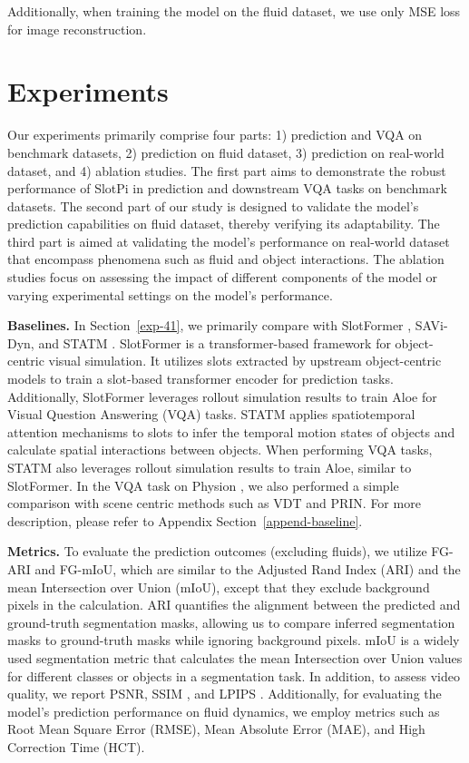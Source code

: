 \documentclass[sigconf]{acmart}
\begin{document}
Additionally, when training the model on the fluid dataset, we use only MSE loss for image reconstruction.


\section{Experiments}

Our experiments primarily comprise four parts: 1) prediction and VQA on benchmark datasets, 2) prediction on fluid dataset, 3)  prediction on real-world dataset, and 4) ablation studies. The first part aims to demonstrate the robust performance of SlotPi in prediction and downstream VQA tasks on benchmark datasets. The second part of our study is designed to validate the model's prediction capabilities on fluid dataset, thereby verifying its adaptability. The third part is aimed at validating the model's performance on real-world dataset that encompass phenomena such as fluid and object interactions.  
The ablation studies focus on assessing the impact of different components of the model or varying experimental settings on the model's performance.

\textbf{Baselines.} In Section~\ref{exp-41}, we primarily compare with SlotFormer \cite{wu2023SlotFormer}, SAVi-Dyn, and STATM \cite{li2024reasoningenhanced}. SlotFormer \cite{wu2023SlotFormer} is a transformer-based framework for object-centric visual simulation. It utilizes slots extracted by upstream object-centric models to train a slot-based transformer encoder for prediction tasks. Additionally, SlotFormer leverages rollout simulation results to train Aloe \cite{ding2021attention} for Visual Question Answering (VQA) tasks. STATM \cite{li2024reasoningenhanced} applies spatiotemporal attention mechanisms to slots to infer the temporal motion states of objects and calculate spatial interactions between objects. When performing VQA tasks, STATM also leverages rollout simulation results to train Aloe, similar to SlotFormer. In the VQA task on Physion \cite{bear2021physion}, we also performed a simple comparison with scene centric methods such as VDT \cite{lu2023vdt} and PRIN.  For more description, please refer to Appendix Section~\ref{append-baseline}.

\textbf{Metrics.} To evaluate the prediction outcomes (excluding fluids), we utilize FG-ARI and FG-mIoU, which are similar to the Adjusted Rand Index (ARI) \cite{rand1971objective, hubert1985comparing} and the mean Intersection over Union (mIoU), except that they exclude background pixels in the calculation. ARI quantifies the alignment between the predicted and ground-truth segmentation masks, allowing us to compare inferred segmentation masks to ground-truth masks while ignoring background pixels. mIoU is a widely used segmentation metric that calculates the mean Intersection over Union values for different classes or objects in a segmentation task. In addition, to assess video quality, we report PSNR, SSIM \cite{wang2004image}, and LPIPS \cite{zhang2018unreasonable}. Additionally, for evaluating the model's prediction performance on fluid dynamics, we employ metrics such as Root Mean Square Error (RMSE), Mean Absolute Error (MAE), and High Correction Time (HCT).
\end{document}
